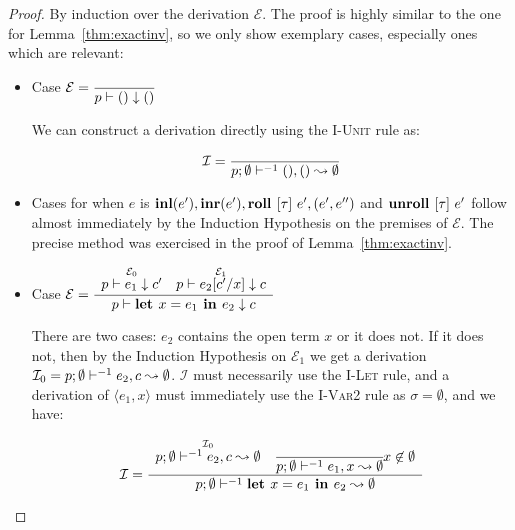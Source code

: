 \begin{proof}

  By induction over the derivation $\mathcal{E}$. The proof is highly similar
  to the one for Lemma~\ref{thm:exactinv}, so we only show exemplary cases,
  especially ones which are relevant:

  \begin{itemize}

    \item Case $\mathcal{E} = \dfrac
      {}
      {p \vdash () \downarrow ()}$

      We can construct a derivation directly using the \textsc{I-Unit} rule as:

      \begin{align*}
        \mathcal{I} = \dfrac
          {}
          {p;\emptyset\vdash^{-1} (), () \leadsto \emptyset}
      \end{align*}

    \item Cases for when $e$ is $\textbf{inl}(e'), \textbf{inr}(e'), \textbf{roll } [\tau]\ e', (e',
      e'')$ and $\textbf{unroll } [\tau]\ e'$ follow almost immediately by the Induction
      Hypothesis on the premises of $\mathcal{E}$. The precise method was
      exercised in the proof of Lemma~\ref{thm:exactinv}.

    \item Case $\mathcal{E} = \dfrac
      {\begin{array}{cc}
        \overset
          {\mathcal{E}_0}
          {p \vdash e_1 \downarrow c'} &
        \overset
          {\mathcal{E}_1}
          {p \vdash e_2 [c' / x] \downarrow c}
       \end{array}
      }
      {p \vdash \textbf{let } x = e_1 \textbf{ in } e_2 \downarrow c}$

      There are two cases: $e_2$ contains the open term $x$ or it does not. If
      it does not, then by the Induction Hypothesis on $\mathcal{E}_1$ we get a
      derivation $\mathcal{I}_0 = p;\emptyset\vdash^{-1} e_2, c \leadsto \emptyset$.
      $\mathcal{I}$ must necessarily use the \textsc{I-Let} rule, and a
      derivation of $\langle e_1, x \rangle$ must immediately use the
      \textsc{I-Var2} rule as $\sigma = \emptyset$, and we have:

      \begin{align*}
        \mathcal{I} = \dfrac
          {\begin{array}{cc}
              \overset
                {\mathcal{I}_0}
                {p;\emptyset\vdash^{-1} e_2, c \leadsto \emptyset} &
              \cfrac
                {}
                {p;\emptyset\vdash^{-1} e_1, x \leadsto \emptyset}
              x \not\in \emptyset
           \end{array}}
          {p;\emptyset\vdash^{-1} \textbf{let } x = e_1 \textbf{ in } e_2 \leadsto \emptyset}
      \end{align*}


\end{itemize}
\end{proof}
